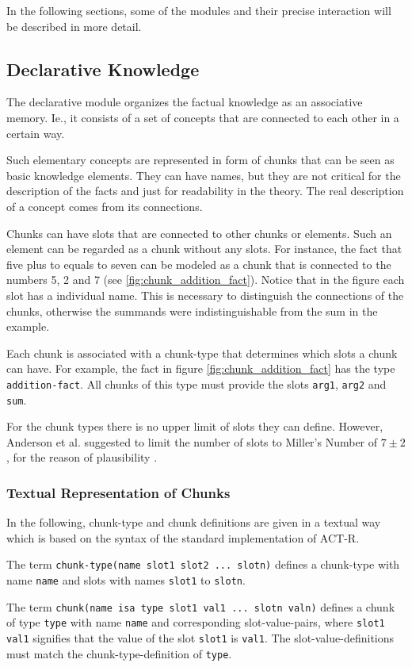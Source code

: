 In the following sections, some of the modules and their precise interaction will be described in more detail.

\subsection{Declarative Knowledge}

The declarative module organizes the factual knowledge as an associative memory. Ie., it consists of a set of concepts that are connected to each other in a certain way.

Such elementary concepts are represented in form of chunks that can be seen as basic knowledge elements. They can have names, but they are not critical for the description of the facts and just for readability in the theory. The real description of a concept comes from its connections.

Chunks can have slots that are connected to other chunks or elements. Such an element can be regarded as a chunk without any slots. For instance, the fact that five plus to equals to seven can be modeled as a chunk that is connected to the numbers 5, 2 and 7 (see \ref{fig:chunk_addition_fact}). Notice that in the figure each slot has a individual name. This is necessary to distinguish the connections of the chunks, otherwise the summands were indistinguishable from the sum in the example.

Each chunk is associated with a chunk-type that determines which slots a chunk can have. For example, the fact in figure \ref{fig:chunk_addition_fact} has the type \verb|addition-fact|. All chunks of this type must provide the slots \verb|arg1|, \verb|arg2| and \verb|sum|.

\label{millers_number}
For the chunk types there is no upper limit of slots they can define. However, Anderson et al. suggested to limit the number of slots to Miller's Number of $7 \pm 2$, for the reason of plausibility \cite{unknown}. 

\subsubsection{Textual Representation of Chunks}

In the following, chunk-type and chunk definitions are given in a textual way which is based on the syntax of the standard implementation of ACT-R.

\begin{definition}
The term \verb|chunk-type(name slot1 slot2 ... slotn)| defines a chunk-type with name \verb|name| and slots with names \verb|slot1| to \verb|slotn|.

The term \verb|chunk(name isa type slot1 val1 ... slotn valn)| defines a chunk of type \verb|type| with name \verb|name| and corresponding slot-value-pairs, where \verb|slot1 val1| signifies that the value of the slot \verb|slot1| is \verb|val1|. The slot-value-definitions must match the chunk-type-definition of \verb|type|.
\end{definition}

